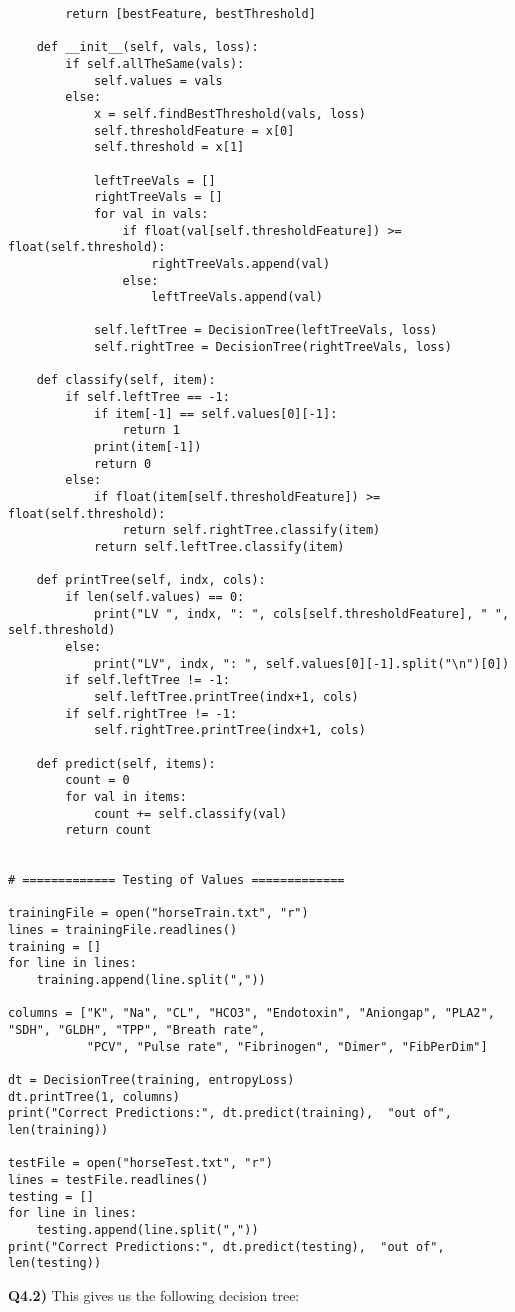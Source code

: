 \documentclass{article}
\begin{document}
\begin{titlepage}
\begin{lstlisting}
        return [bestFeature, bestThreshold]

    def __init__(self, vals, loss):
        if self.allTheSame(vals):
            self.values = vals
        else:
            x = self.findBestThreshold(vals, loss)
            self.thresholdFeature = x[0]
            self.threshold = x[1]

            leftTreeVals = []
            rightTreeVals = []
            for val in vals:
                if float(val[self.thresholdFeature]) >= float(self.threshold):
                    rightTreeVals.append(val)
                else:
                    leftTreeVals.append(val)

            self.leftTree = DecisionTree(leftTreeVals, loss)
            self.rightTree = DecisionTree(rightTreeVals, loss)

    def classify(self, item):
        if self.leftTree == -1:
            if item[-1] == self.values[0][-1]:
                return 1
            print(item[-1])
            return 0
        else:
            if float(item[self.thresholdFeature]) >= float(self.threshold):
                return self.rightTree.classify(item)
            return self.leftTree.classify(item)

    def printTree(self, indx, cols):
        if len(self.values) == 0:
            print("LV ", indx, ": ", cols[self.thresholdFeature], " ", self.threshold)
        else:
            print("LV", indx, ": ", self.values[0][-1].split("\n")[0])
        if self.leftTree != -1:
            self.leftTree.printTree(indx+1, cols)
        if self.rightTree != -1:
            self.rightTree.printTree(indx+1, cols)

    def predict(self, items):
        count = 0
        for val in items:
            count += self.classify(val)
        return count


# ============= Testing of Values =============

trainingFile = open("horseTrain.txt", "r")
lines = trainingFile.readlines()
training = []
for line in lines:
    training.append(line.split(","))

columns = ["K", "Na", "CL", "HCO3", "Endotoxin", "Aniongap", "PLA2", "SDH", "GLDH", "TPP", "Breath rate",
           "PCV", "Pulse rate", "Fibrinogen", "Dimer", "FibPerDim"]

dt = DecisionTree(training, entropyLoss)
dt.printTree(1, columns)
print("Correct Predictions:", dt.predict(training),  "out of", len(training))

testFile = open("horseTest.txt", "r")
lines = testFile.readlines()
testing = []
for line in lines:
    testing.append(line.split(","))
print("Correct Predictions:", dt.predict(testing),  "out of", len(testing))
\end{lstlisting}
\textbf{Q4.2)} This gives us the following decision tree:\\\\


\end{titlepage}
\end{document}
